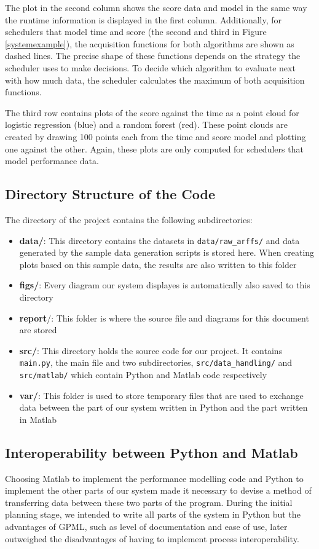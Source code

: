 \documentclass[a4paper,12pt,twoside,openright]{report}
\begin{document}
The plot in the second column shows the score data and model in the same way the runtime information is displayed in the first column. Additionally, for schedulers that model time and score (the second and third in Figure \ref{systemexample}), the acquisition functions for both algorithms are shown as dashed lines. The precise shape of these functions depends on the strategy the scheduler uses to make decisions. To decide which algorithm to evaluate next with how much data, the scheduler calculates the maximum of both acquisition functions.

The third row contains plots of the score against the time as a point cloud for logistic regression (blue) and a random forest (red). These point clouds are created by drawing 100 points each from the time and score model and plotting one against the other. Again, these plots are only computed for schedulers that model performance data.



\subsection{Directory Structure of the Code}

The directory of the project contains the following subdirectories:
\begin{itemize}
\item \textbf{data/}: This directory contains the datasets in \texttt{data/raw\_arffs/} and data generated by the sample data generation scripts is stored here. When creating plots based on this sample data, the results are also written to this folder
\item \textbf{figs/}: Every diagram our system displayes is automatically also saved to this directory
\item \textbf{report}/: This folder is where the source file and diagrams for this document are stored
\item \textbf{src/}: This directory holds the source code for our project. It contains \texttt{main.py}, the main file and two subdirectories, \texttt{src/data\_handling/} and \texttt{src/matlab/} which contain Python and Matlab code respectively
\item \textbf{var/}: This folder is used to store temporary files that are used to exchange data between the part of our system written in Python and the part written in Matlab
\end{itemize}



\subsection{Interoperability between Python and Matlab}
Choosing Matlab to implement the performance modelling code and Python to implement the other parts of our system made it necessary to devise a method of transferring data between these two parts of the program. During the initial planning stage, we intended to write all parts of the system in Python but the advantages of GPML, such as level of documentation and ease of use, later outweighed the disadvantages of having to implement process interoperability.
\end{document}
